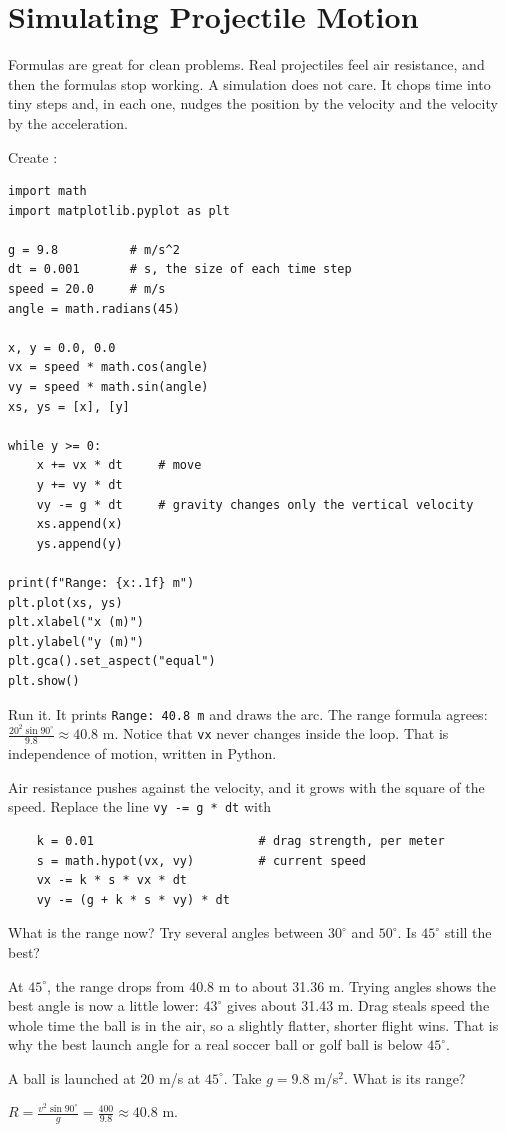 \section{Simulating Projectile Motion}

Formulas are great for clean problems. Real projectiles feel air
resistance, and then the formulas stop working. A simulation does not
care. It chops time into tiny steps and, in each one, nudges the position by
the velocity and the velocity by the acceleration.

Create :

\begin{verbatim}
import math
import matplotlib.pyplot as plt

g = 9.8          # m/s^2
dt = 0.001       # s, the size of each time step
speed = 20.0     # m/s
angle = math.radians(45)

x, y = 0.0, 0.0
vx = speed * math.cos(angle)
vy = speed * math.sin(angle)
xs, ys = [x], [y]

while y >= 0:
    x += vx * dt     # move
    y += vy * dt
    vy -= g * dt     # gravity changes only the vertical velocity
    xs.append(x)
    ys.append(y)

print(f"Range: {x:.1f} m")
plt.plot(xs, ys)
plt.xlabel("x (m)")
plt.ylabel("y (m)")
plt.gca().set_aspect("equal")
plt.show()
\end{verbatim}

Run it. It prints \texttt{Range: 40.8 m} and draws the arc. The range
formula agrees: $\frac{20^2 \sin 90^\circ}{9.8} \approx 40.8$ m. Notice
that \texttt{vx} never changes inside the loop. That is
independence of motion, written in Python.

\begin{Exercise}[title={Adding air}, label=proj_drag]
Air resistance pushes against the velocity, and it grows with the square of
the speed. Replace the line \texttt{vy -= g * dt} with
\begin{verbatim}
    k = 0.01                       # drag strength, per meter
    s = math.hypot(vx, vy)         # current speed
    vx -= k * s * vx * dt
    vy -= (g + k * s * vy) * dt
\end{verbatim}
What is the range now? Try several angles between $30^\circ$ and
$50^\circ$. Is $45^\circ$ still the best?
\end{Exercise}
\begin{Answer}[ref=proj_drag]
At $45^\circ$, the range drops from 40.8 m to about 31.36 m. Trying angles
shows the best angle is now a little lower: $43^\circ$ gives about 31.43 m. Drag steals speed
the whole time the ball is in the air, so a slightly flatter, shorter
flight wins. That is why the best launch angle for a real soccer ball or
golf ball is below $45^\circ$.
\end{Answer}

\begin{Exercise}[title={Range at 45 Degrees}, label=proj1]
A ball is launched at $20$ m/s at $45^\circ$. Take $g = 9.8$ m/s$^2$. What is its range?
\end{Exercise}
\begin{Answer}[ref=proj1]
$R = \frac{v^2 \sin 90^\circ}{g} = \frac{400}{9.8} \approx 40.8$ m.
\end{Answer}
